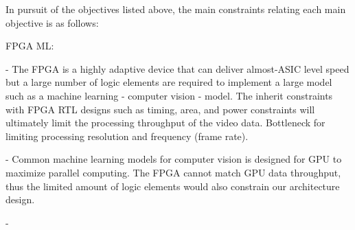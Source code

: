 In pursuit of the objectives listed above, the main constraints relating 
each main objective is as follows:

FPGA ML:

- The FPGA is a highly adaptive device that can deliver almost-ASIC level speed
but a large number of logic elements are required to implement a large model 
such as a machine learning - computer vision - model. The inherit constraints
with FPGA RTL designs such as timing, area, and power constraints will ultimately
limit the processing throughput of the video data. Bottleneck for limiting
processing resolution and frequency (frame rate).

- Common machine learning models for computer vision is designed for GPU to
maximize parallel computing. The FPGA cannot match GPU data throughput, thus
the limited amount of logic elements would also constrain our architecture
design.

- 